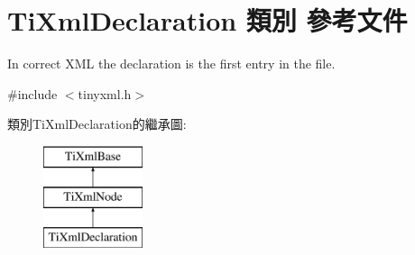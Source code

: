 \hypertarget{class_ti_xml_declaration}{}\section{Ti\+Xml\+Declaration 類別 參考文件}
\label{class_ti_xml_declaration}


In correct X\+ML the declaration is the first entry in the file.  




{\ttfamily \#include $<$tinyxml.\+h$>$}

類別\+Ti\+Xml\+Declaration的繼承圖\+:\begin{figure}[H]
\begin{center}
\leavevmode
\includegraphics[height=3.000000cm]{class_ti_xml_declaration}
\end{center}
\end{figure}
